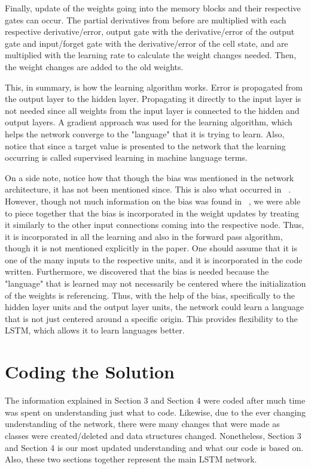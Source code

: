 \documentclass[11pt,letterpaper]{article}
\begin{document}
Finally, update of the weights going into the memory blocks and their respective gates can occur. The partial derivatives from before are multiplied with each respective derivative/error, output gate with the derivative/error of the output gate and input/forget gate with the derivative/error of the cell state, and are multiplied with the learning rate to calculate the weight changes needed. Then, the weight changes are added to the old weights. 

This, in summary, is how the learning algorithm works. Error is propagated from the output layer to the hidden layer. Propagating it directly to the input layer is not needed since all weights from the input layer is connected to the hidden and output layers. A gradient approach was used for the learning algorithm, which helps the network converge to the "language" that it is trying to learn. Also, notice that since a target value is presented to the network that the learning occurring is called supervised learning in machine language terms.

On a side note, notice how that though the bias was mentioned in the network architecture, it has not been mentioned since. This is also what occurred in ~\cite{Gers:01}. However, though not much information on the bias was found in ~\cite{Gers:01}, we were able to piece together that the bias is incorporated in the weight updates by treating it similarly to the other input connections coming into the respective node. Thus, it is incorporated in all the learning and also in the forward pass algorithm, though it is not mentioned explicitly in the paper. One should assume that it is one of the many inputs to the respective units, and it is incorporated in the code written. Furthermore, we discovered that the bias is needed because the "language" that is learned may not necessarily be centered where the initialization of the weights is referencing. Thus, with the help of the bias, specifically to the hidden layer units and the output layer units, the network could learn a language that is not just centered around a specific origin. This provides flexibility to the LSTM, which allows it to learn languages better. 
 
\section{Coding the Solution}
The information explained in Section 3 and Section 4 were coded after much time was spent on understanding just what to code. Likewise, due to the ever changing understanding of the network, there were many changes that were made as classes were created/deleted and data structures changed. Nonetheless, Section 3 and Section 4 is our most updated understanding and what our code is based on. Also, these two sections together represent the main LSTM network. 
\end{document}
